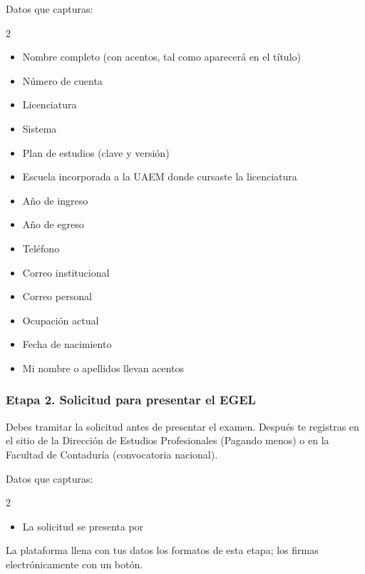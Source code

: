 Datos que capturas:
\begin{multicols}{2}\small
\begin{itemize}
  \item Nombre completo (con acentos, tal como aparecerá en el título)
  \item Número de cuenta
  \item Licenciatura
  \item Sistema
  \item Plan de estudios (clave y versión)
  \item Escuela incorporada a la UAEM donde cursaste la licenciatura
  \item Año de ingreso
  \item Año de egreso
  \item Teléfono
  \item Correo institucional
  \item Correo personal
  \item Ocupación actual
  \item Fecha de nacimiento
  \item Mi nombre o apellidos llevan acentos
\end{itemize}
\end{multicols}
\subsubsection*{Etapa 2. Solicitud para presentar el EGEL}
Debes tramitar la solicitud antes de presentar el examen. Después te registras en el sitio de la Dirección de Estudios Profesionales (Pagando menos) o en la Facultad de Contaduría (convocatoria nacional).

Datos que capturas:
\begin{multicols}{2}\small
\begin{itemize}
  \item La solicitud se presenta por
\end{itemize}
\end{multicols}

La plataforma llena con tus datos los formatos de esta etapa; los firmas electrónicamente con un botón.

